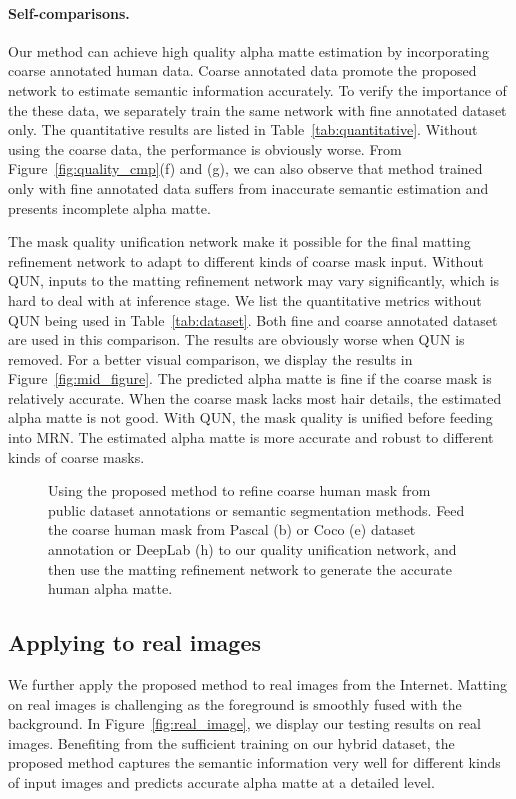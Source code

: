 \documentclass[10pt,twocolumn,letterpaper]{article}
\begin{document}
\paragraph{Self-comparisons.} Our method can achieve high quality alpha matte estimation by incorporating coarse annotated human data. Coarse annotated data promote the proposed network to estimate semantic information accurately. To verify the importance of the these data, we separately train the same network with fine annotated dataset only. The quantitative results are listed in Table~\ref{tab:quantitative}. Without using the coarse data, the performance is obviously worse. From Figure~\ref{fig:quality_cmp}(f) and (g), we can also observe that method trained only with fine annotated data suffers from inaccurate semantic estimation and presents incomplete alpha matte.

The mask quality unification network make it possible for the final matting refinement network to adapt to different kinds of coarse mask input. Without QUN, inputs to the matting refinement network may vary significantly, which is hard to deal with at inference stage. We list the quantitative metrics without QUN being used in Table~\ref{tab:dataset}. Both fine and coarse annotated dataset are used in this comparison. The results are obviously worse when QUN is removed. For a better visual comparison, we display the results in Figure~\ref{fig:mid_figure}. The predicted alpha matte is fine if the coarse mask is relatively accurate. When the coarse mask lacks most hair details, the estimated alpha matte is not good. With QUN, the mask quality is unified before feeding into MRN. The estimated alpha matte is more accurate and robust to different kinds of coarse masks.

\begin{figure}[t!]
  \centering
  \caption{Using the proposed method to refine coarse human mask from public dataset annotations or semantic segmentation methods. Feed the coarse human mask from Pascal (b) or Coco (e) dataset annotation or DeepLab (h) to our quality unification network, and then use the matting refinement network to generate the accurate human alpha matte.}
  \label{fig:application}
\end{figure}

\subsection{Applying to real images}
We further apply the proposed method to real images from the Internet. Matting on real images is challenging as the foreground is smoothly fused with the background. In Figure~\ref{fig:real_image}, we display our testing results on real images. Benefiting from the sufficient training on our hybrid dataset, the proposed method captures the semantic information very well for different kinds of input images and predicts accurate alpha matte at a detailed level.
\end{document}
